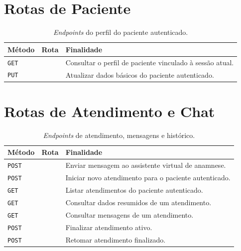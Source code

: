 \begin{apendicesenv}
\section{Rotas de Paciente}

\begin{table}[htb]
\centering
\caption{\textit{Endpoints} do perfil do paciente autenticado.}
\label{tab:api-paciente}
\begin{tabularx}{\textwidth}{p{2.2cm}p{4.1cm}Y}
\hline
Método & Rota & Finalidade \\
\hline
\texttt{GET} &  & Consultar o perfil de paciente vinculado à sessão atual. \\
\texttt{PUT} &  & Atualizar dados básicos do paciente autenticado. \\
\hline
\end{tabularx}
\end{table}

\section{Rotas de Atendimento e Chat}

\begin{table}[H]
\centering
\caption{\textit{Endpoints} de atendimento, mensagens e histórico.}
\label{tab:api-atendimentos}
\begin{tabularx}{\textwidth}{p{2.2cm}p{5.0cm}Y}
\hline
Método & Rota & Finalidade \\
\hline
\texttt{POST} &  & Enviar mensagem ao assistente virtual de anamnese. \\
\texttt{POST} &  & Iniciar novo atendimento para o paciente autenticado. \\
\texttt{GET} &  & Listar atendimentos do paciente autenticado. \\
\texttt{GET} &  & Consultar dados resumidos de um atendimento. \\
\texttt{GET} &  & Consultar mensagens de um atendimento. \\
\texttt{POST} &  & Finalizar atendimento ativo. \\
\texttt{POST} &  & Retomar atendimento finalizado. \\
\hline
\end{tabularx}
\end{table}


\end{apendicesenv}
